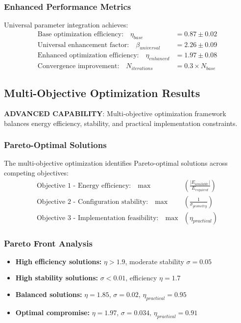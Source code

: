 \documentclass[12pt]{article}
\begin{document}
\subsubsection{Enhanced Performance Metrics}
Universal parameter integration achieves:
\begin{align}
\text{Base optimization efficiency:} \quad \eta_{base} &= 0.87 \pm 0.02 \\
\text{Universal enhancement factor:} \quad \beta_{universal} &= 2.26 \pm 0.09 \\
\text{Enhanced optimization efficiency:} \quad \eta_{enhanced} &= 1.97 \pm 0.08 \\
\text{Convergence improvement:} \quad N_{iterations} &= 0.3 \times N_{base}
\end{align}

\subsection{Multi-Objective Optimization Results}
\textbf{ADVANCED CAPABILITY}: Multi-objective optimization framework balances energy efficiency, stability, and practical implementation constraints.

\subsubsection{Pareto-Optimal Solutions}
The multi-objective optimization identifies Pareto-optimal solutions across competing objectives:
\begin{align}
\text{Objective 1 - Energy efficiency:} \quad \max &\left(\frac{|E_{available}|}{E_{required}}\right) \\
\text{Objective 2 - Configuration stability:} \quad \max &\left(\frac{1}{\sigma_{geometry}}\right) \\
\text{Objective 3 - Implementation feasibility:} \quad \max &\left(\eta_{practical}\right)
\end{align}

\subsubsection{Pareto Front Analysis}
\begin{itemize}
\item \textbf{High efficiency solutions:} $\eta > 1.9$, moderate stability $\sigma = 0.05$
\item \textbf{High stability solutions:} $\sigma < 0.01$, efficiency $\eta = 1.7$
\item \textbf{Balanced solutions:} $\eta = 1.85$, $\sigma = 0.02$, $\eta_{practical} = 0.95$
\item \textbf{Optimal compromise:} $\eta = 1.97$, $\sigma = 0.034$, $\eta_{practical} = 0.91$
\end{itemize}
\end{document}
